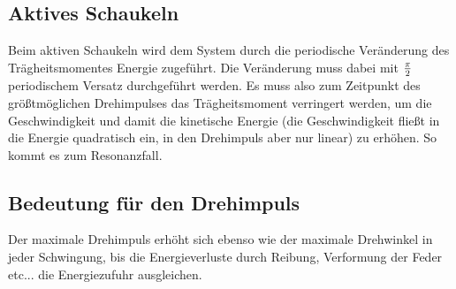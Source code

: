 \subsection{Aktives Schaukeln}

Beim aktiven Schaukeln wird dem System durch die periodische Veränderung des Träg\-heits\-mo\-men\-tes Energie zugeführt.
Die Veränderung muss dabei mit $\pi \over 2$ periodischem Versatz durchgeführt werden.
Es muss also zum Zeitpunkt des größtmöglichen Drehimpulses das Träg\-heits\-mo\-men\-t verringert werden, um die Geschwindigkeit und damit die kinetische Energie (die Geschwindigkeit fließt in die Energie quadratisch ein, in den Drehimpuls aber nur linear) zu erhöhen.
So kommt es zum Resonanzfall.

\subsection{Bedeutung für den Drehimpuls}

Der maximale Drehimpuls erhöht sich ebenso wie der maximale Drehwinkel in jeder Schwingung, bis die Energieverluste durch Reibung, Verformung der Feder etc... die Energiezufuhr ausgleichen.
